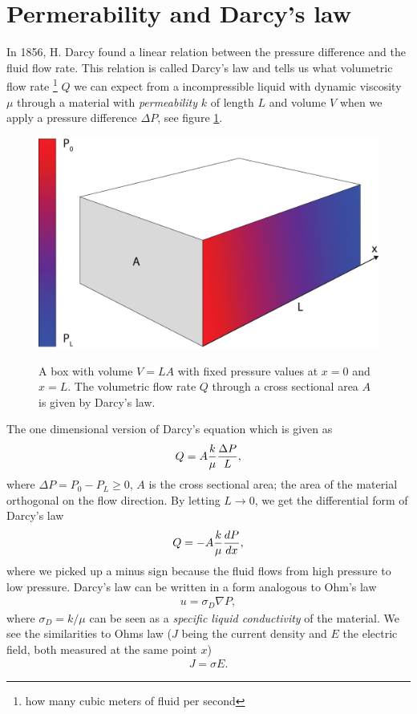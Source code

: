 \section{Permerability and Darcy's law}
\label{sec:darcy_law}
In 1856, H. Darcy found a linear relation between the pressure difference and the fluid flow rate. This relation is called Darcy's law and tells us what volumetric flow rate \footnote{how many cubic meters of fluid per second} $Q$ we can expect from a incompressible liquid with dynamic viscosity $\mu$ through a material with \textit{permeability} $k$ of length $L$ and volume $V$ when we apply a pressure difference $\Delta P$, see figure \ref{fig:darcys_law}. 
\begin{figure}[h]
\begin{center}
\includegraphics[width=\textwidth, trim=0cm 0cm 0cm 0cm, clip]{kinetic_theory/figures/darcy.eps}
\label{fig:darcys_law}
\end{center}
\caption{A box with volume $V=LA$ with fixed pressure values at $x=0$ and $x=L$. The volumetric flow rate $Q$ through a cross sectional area $A$ is given by Darcy's law.}
\end{figure}
The one dimensional version of Darcy's equation which is given as
\begin{align}
\label{eq:darcy_1}
	Q = A{k\over \mu}{\Delta P\over L},
\end{align}
where $\Delta P = P_0 - P_L \geq 0$, $A$ is the cross sectional area; the area of the material orthogonal on the flow direction. By letting $L\rightarrow 0$, we get the differential form of Darcy's law
\begin{align}
\label{eq:darcy_2}
	Q = -A{k\over \mu}{dP\over dx},
\end{align}
where we picked up a minus sign because the fluid flows from high pressure to low pressure. Darcy's law can be written in a form analogous to Ohm's law
\begin{align}
	u = \sigma_D \nabla P,
\end{align}
where $\sigma_D=k/\mu$ can be seen as a \textit{specific liquid conductivity} of the material. We see the similarities to Ohms law ($J$ being the current density and $E$ the electric field, both measured at the same point $x$) 
\begin{align}
	J = \sigma E.
\end{align}
